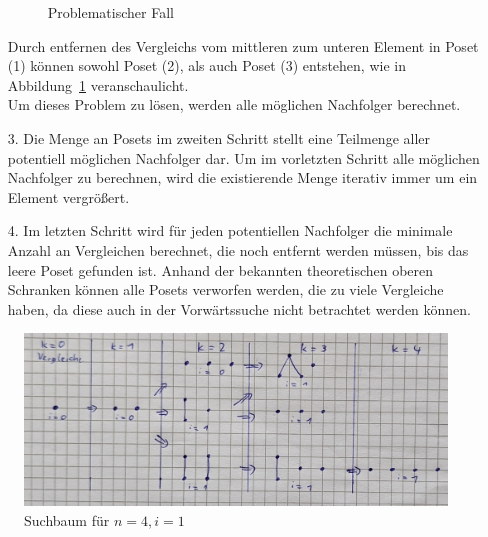 \documentclass[10pt,journal,compsoc]{IEEEtran}
\begin{document}
\begin{itemize}
\begin{figure}
      \centering
      \caption{Problematischer Fall}
      \label{fig:backward_problematic}
    \end{figure}
    Durch entfernen des Vergleichs vom mittleren zum unteren Element in Poset (1) können sowohl Poset (2), als auch Poset (3) entstehen, wie in Abbildung~\ref{fig:backward_problematic} veranschaulicht. \\
    Um dieses Problem zu lösen, werden alle möglichen Nachfolger berechnet.

  \item[3.]
    Die Menge an Posets im zweiten Schritt stellt eine Teilmenge aller potentiell möglichen Nachfolger dar.
    Um im vorletzten Schritt alle möglichen Nachfolger zu berechnen, wird die existierende Menge iterativ immer um ein Element vergrößert.

  \item[4.]
    Im letzten Schritt wird für jeden potentiellen Nachfolger die minimale Anzahl an Vergleichen berechnet, die noch entfernt werden müssen, bis das leere Poset gefunden ist.
    Anhand der bekannten theoretischen oberen Schranken können alle Posets verworfen werden, die zu viele Vergleiche haben, da diese auch in der Vorwärtssuche nicht betrachtet werden können.
\end{itemize}

\begin{figure}[h!]
  \centering
  \includegraphics[width=\columnwidth]{figures/backward-search-tree.jpg}
  \caption{Suchbaum für $n = 4, i = 1$}
  \label{fig:backward-search-tree}
\end{figure}
\end{document}
